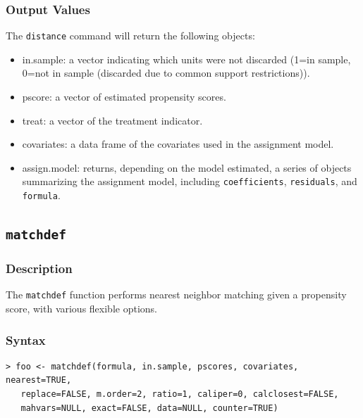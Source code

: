 \documentclass[oneside,letterpaper,titlepage]{article}
\begin{document}
\begin{appendix}
\subsubsection{Output Values}
The \texttt{distance} command will return the following objects:
\begin{itemize}
\item{in.sample}: a vector indicating which units were not discarded
  (1=in sample, 0=not in sample (discarded due to common support
  restrictions)).
\item{pscore}: a vector of estimated propensity scores. 
\item{treat}: a vector of the treatment indicator.
\item{covariates}: a data frame of the covariates used in the
  assignment model.
\item{assign.model}: returns, depending on the model estimated, a 
  series of objects summarizing the assignment model, including
  \texttt{coefficients}, \texttt{residuals},
  and \texttt{formula}. 
\end{itemize}

\subsection{\texttt{matchdef}}
\subsubsection{Description}
The \texttt{matchdef} function performs nearest neighbor matching
given a propensity score, with various flexible options. 

\subsubsection{Syntax}
\begin{verbatim}
> foo <- matchdef(formula, in.sample, pscores, covariates, nearest=TRUE,
   replace=FALSE, m.order=2, ratio=1, caliper=0, calclosest=FALSE,
   mahvars=NULL, exact=FALSE, data=NULL, counter=TRUE)
\end{verbatim}


\end{appendix}
\end{document}
